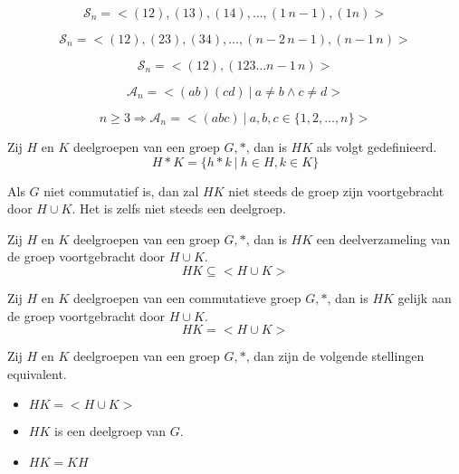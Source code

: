 \documentclass[main.tex]{subfiles}
\begin{document}
\begin{pr}
  \[ \mathcal{S}_n = <(12),(13),(14),\dotsc, (1\, n-1), (1n)> \]
\end{pr}

\begin{pr}
  \[ \mathcal{S}_n = <(12),(23),(34),\dotsc, (n-2\, n-1), (n-1\,n)> \]
\end{pr}

\begin{pr}
  \[ \mathcal{S}_n = <(12), (123\dotsc n-1\,n)> \]
\end{pr}

\begin{pr}
  \[ \mathcal{A}_n = <(ab)(cd)\ |\ a\neq b \wedge c \neq d> \]
\end{pr}

\begin{pr}
  \[ n \ge 3 \Rightarrow \mathcal{A}_n = <(abc)\ |\ a,b,c \in \{1,2,\dotsc,n\}> \]
\end{pr}

\begin{de}
  Zij $H$ en $K$ deelgroepen van een groep $G,*$, dan is $HK$ als volgt gedefinieerd.
  \[ H*K = \{ h*k\ |\ h\in H, k\in K \} \]
\end{de}

\begin{opm}
  \label{opm:verm-deelgroepen-niet-noodzakelijk-deelgroep}
  Als $G$ niet commutatief is, dan zal $HK$ niet steeds de groep zijn voortgebracht door $H\cup K$.
  Het is zelfs niet steeds een deelgroep.
\end{opm}

\begin{st}
  \label{st:verm-deelgroepen-deel-van-voortbrenging-van-unie}
  Zij $H$ en $K$ deelgroepen van een groep $G,*$, dan is $HK$ een deelverzameling van de groep voortgebracht door $H\cup K$.
  \[ HK \subseteq <H\cup K> \]
\end{st}

\begin{st}
  Zij $H$ en $K$ deelgroepen van een commutatieve groep $G,*$, dan is $HK$ gelijk aan de groep voortgebracht door $H\cup K$.
  \[ HK = <H\cup K> \]
\end{st}

\begin{pr}
  Zij $H$ en $K$ deelgroepen van een groep $G,*$, dan zijn de volgende stellingen equivalent.
  \begin{itemize}
  \item $HK = <H\cup K>$
  \item $HK$ is een deelgroep van $G$.
  \item $HK = KH$
  \end{itemize}
\end{pr}
\end{document}
